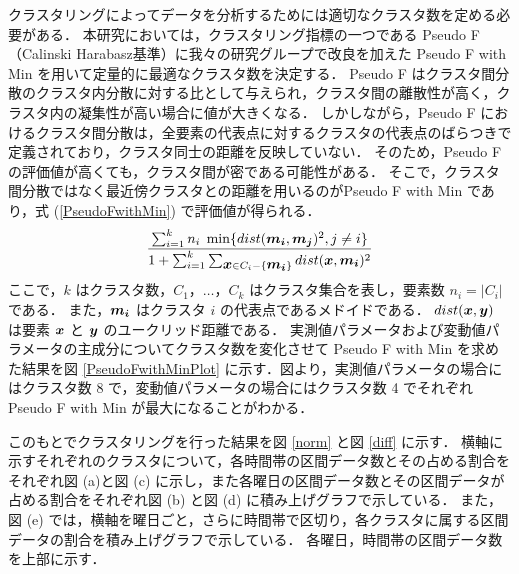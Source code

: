 \documentclass[technicalreport]{ieicej}
\begin{document}
クラスタリングによってデータを分析するためには適切なクラスタ数を定める必要がある．
本研究においては，クラスタリング指標の一つである Pseudo F（Calinski Harabasz基準）\cite{liu2010understanding}に我々の研究グループで改良を加えた Pseudo F with Min\cite{kanajiri} を用いて定量的に最適なクラスタ数を決定する．
Pseudo F はクラスタ間分散のクラスタ内分散に対する比として与えられ，クラスタ間の離散性が高く，クラスタ内の凝集性が高い場合に値が大きくなる．
しかしながら，Pseudo F におけるクラスタ間分散は，全要素の代表点に対するクラスタの代表点のばらつきで定義されており，クラスタ同士の距離を反映していない．
そのため，Pseudo F の評価値が高くても，クラスタ間が密である可能性がある．
そこで，クラスタ間分散ではなく最近傍クラスタとの距離を用いるのがPseudo F with Min であり，式 (\ref{PseudoFwithMin}) で評価値が得られる．
\begin{equation}
\frac{\sum^k_{i=1} n_{i}\hspace{0.1cm} \min \{ dist(\mbox{\boldmath $m_{i}$},\mbox{\boldmath $m_j$})^2,j \neq i \}}{1 + \sum^k_{i=1} \sum_{\mbox{\boldmath $x$} \in C_i - \{\mbox{\boldmath $m_i$}\}} dist(\mbox{\boldmath $x$},\mbox{\boldmath $m_{i}$})^2}
\label{PseudoFwithMin}
\end{equation}
ここで，$k$ はクラスタ数，$C_1，\ldots，C_k$ はクラスタ集合を表し，要素数 $n_i=|C_i|$ である．
また，$\mbox{\boldmath $m_i$}$ はクラスタ $i$ の代表点であるメドイドである\cite{mouratidis2005medoid}．
$dist(\mbox{\boldmath $x$},\mbox{\boldmath $y$})$ は要素 $\mbox{\boldmath $x$}$ と $\mbox{\boldmath $y$}$ のユークリッド距離である．
実測値パラメータおよび変動値パラメータの主成分についてクラスタ数を変化させて Pseudo F with Min を求めた結果を図 \ref{PseudoFwithMinPlot} に示す．図より，実測値パラメータの場合にはクラスタ数 8 で，変動値パラメータの場合にはクラスタ数 4 でそれぞれ Pseudo F with Min が最大になることがわかる．

このもとでクラスタリングを行った結果を図 \ref{norm} と図 \ref{diff} に示す．
横軸に示すそれぞれのクラスタについて，各時間帯の区間データ数とその占める割合をそれぞれ図 (a)と図 (c) に示し，また各曜日の区間データ数とその区間データが占める割合をそれぞれ図 (b) と図 (d) に積み上げグラフで示している．
また，図 (e) では，横軸を曜日ごと，さらに時間帯で区切り，各クラスタに属する区間データの割合を積み上げグラフで示している．
各曜日，時間帯の区間データ数を上部に示す．
\end{document}

